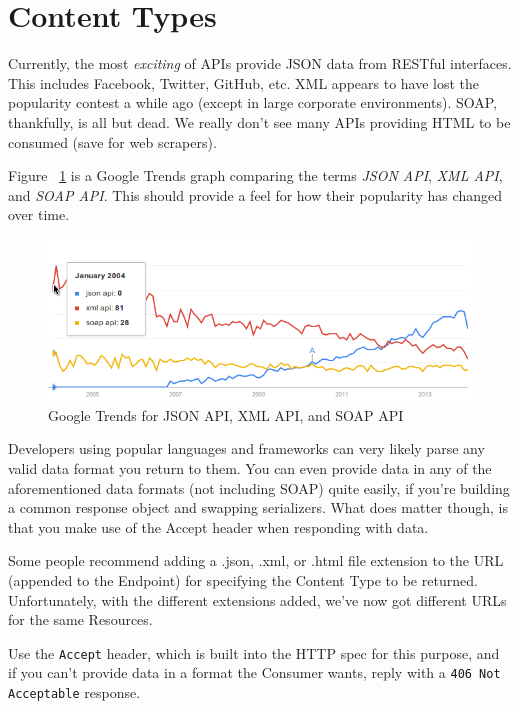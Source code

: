 \documentclass{book}
\begin{document}
\section{Content Types}

Currently, the most \emph{exciting} of APIs provide JSON data from RESTful interfaces. This includes Facebook, Twitter, GitHub, etc. XML appears to have lost the popularity contest a while ago (except in large corporate environments). SOAP, thankfully, is all but dead. We really don't see many APIs providing HTML to be consumed (save for web scrapers).

Figure ~\ref{fig:googletrends} is a Google Trends graph comparing the terms \emph{JSON API}, \emph{XML API}, and \emph{SOAP API}. This should provide a feel for how their popularity has changed over time.

\begin{figure}[ht!]
\centering
\includegraphics[width=140mm]{images/xml-vs-json-vs-soap-google-trends.png}
\caption{Google Trends for JSON API, XML API, and SOAP API}
\label{fig:googletrends}
\end{figure}

Developers using popular languages and frameworks can very likely parse any valid data format you return to them. You can even provide data in any of the aforementioned data formats (not including SOAP) quite easily, if you're building a common response object and swapping serializers. What does matter though, is that you make use of the Accept header when responding with data.

Some people recommend adding a .json, .xml, or .html file extension to the URL (appended to the Endpoint) for specifying the Content Type to be returned. Unfortunately, with the different extensions added, we've now got different URLs for the same Resources.

Use the \texttt{Accept} header, which is built into the HTTP spec for this purpose, and if you can't provide data in a format the Consumer wants, reply with a \texttt{406 Not Acceptable} response.
\end{document}
